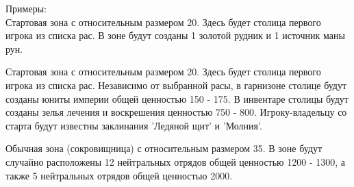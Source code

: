 Примеры:\\
Стартовая зона с относительным размером 20. Здесь будет столица первого игрока из списка рас.
В зоне будут созданы 1 золотой рудник и 1 источник маны рун.

\begin{figure}[H]

\end{figure}

Стартовая зона с относительным размером 20. Здесь будет столица первого игрока из списка рас.
Независимо от выбранной расы, в гарнизоне столице будут созданы юниты империи общей ценностью 150 - 175.
В инвентаре столицы будут созданы зелья лечения и воскрешения ценностью 750 - 800.
Игроку-владельцу со старта будут известны заклинания 'Ледяной щит' и 'Молния'.

\begin{figure}[H]

\end{figure}

Обычная зона (сокровищница) с относительным размером 35.
В зоне будут случайно расположены 12 нейтральных отрядов общей ценностью 1200 - 1300,
а также 5 нейтральных отрядов общей ценностью 2000.

\begin{figure}[H]

\end{figure}